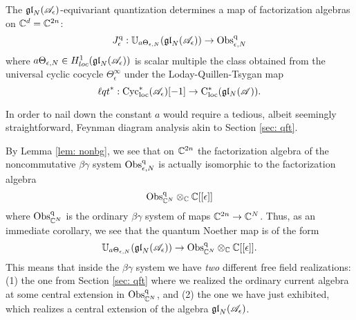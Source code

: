 \begin{prop}
The ${\mathfrak{gl}}_N(\mathscr A_\epsilon)$-equivariant quantization determines a map of factorization algebras on $\mathbb C^d = \mathbb C^{2n}$: 
\[
J^{\rm q}_\epsilon: \mathbb U_{a \Theta_{\epsilon, N}} ({\mathfrak{gl}}_N(\mathscr A_\epsilon)) \to {\rm Obs}^{\rm q}_{\epsilon, N}
\]
where $a \Theta_{\epsilon, N} \in H^1_{loc}({\mathfrak{gl}}_N(\mathscr A_{\epsilon}))$ is scalar multiple the class obtained from the universal cyclic cocycle $\Theta_{\epsilon}^\infty$ under the Loday-Quillen-Tsygan map
\[
{\ell q t}^* : {\rm Cyc}_{\rm loc}^*(\mathscr A_\epsilon)[-1] \to {\rm C}_{\rm loc}^*(\mathfrak{g} \mathfrak{l}_N( \mathscr A))  .
\]
\end{prop}

\begin{rmk}
In order to nail down the constant $a$ would require a tedious, albeit seemingly straightforward, Feynman diagram analysis akin to Section \ref{sec: qft}. 
\end{rmk}

By Lemma \ref{lem: nonbg}, we see that on $\mathbb C^{2n}$ the factorization algebra of the noncommutative $\beta\gamma$ system ${\rm Obs}^{\rm q}_{\epsilon, N}$ is actually isomorphic to the factorization algebra
\[
{\rm Obs}^{\rm q}_{\mathbb C^{N}} \otimes_{\mathbb C} \mathbb C[[\epsilon]]
\]
where ${\rm Obs}^{\rm q}_{\mathbb C^{N}}$ is the ordinary $\beta\gamma$ system of maps $\mathbb C^{2n} \to \mathbb C^N$. 
Thus, as an immediate corollary, we see that the quantum Noether map is of the form
\[
\mathbb U_{a \Theta_{\epsilon, N}} ({\mathfrak{gl}}_N(\mathscr A_\epsilon)) \to {\rm Obs}^{\rm q}_{\mathbb C^{N}} \otimes_{\mathbb C} \mathbb C[[\epsilon]] .
\]
This means that inside the $\beta\gamma$ system we have {\em two} different free field realizations: (1) the one from Section \ref{sec: qft} where we realized the ordinary current algebra at some central extension in ${\rm Obs}^{\rm q}_{\mathbb C^{N}}$, and (2) the one we have just exhibited, which realizes a central extension of the algebra ${\mathfrak{gl}}_N(\mathscr A_{\epsilon})$. 
